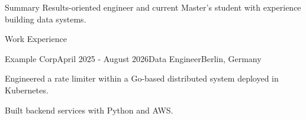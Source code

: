 \documentclass{resume}
\begin{document}


\begin{rSection}{Summary}
Results-oriented engineer and current Master's student with experience building data systems.
\end{rSection}


\begin{rSection}{Work Experience}

    \begin{rSubsection}{Example Corp}{April 2025 - August 2026}{Data Engineer}{Berlin, Germany}
        \item Engineered a rate limiter within a Go-based distributed system deployed in Kubernetes.
        \item Built backend services with Python and AWS.
    \end{rSubsection}
    
\end{rSection}


\end{document}

